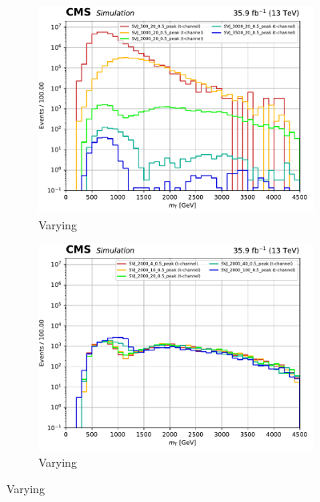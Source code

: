 \begin{figure}[htbp]
    \centering
    \begin{subfigure}[b]{0.48\textwidth}
        \includegraphics[width=\textwidth]{figures/t_channel_benchmark_variations/dijet_mt/mPhi.pdf}
        \caption{Varying \mBifund}
    \end{subfigure}
    \hfill
    \begin{subfigure}[b]{0.48\textwidth}
        \includegraphics[width=\textwidth]{figures/t_channel_benchmark_variations/dijet_mt/mD.pdf}
        \caption{Varying \mDark}
    \end{subfigure}


\end{figure}
